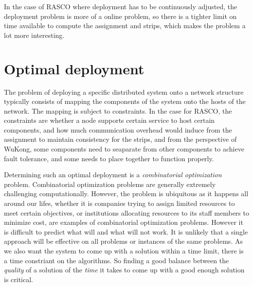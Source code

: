 In the case of RASCO where deployment has to be continuously adjusted, the
deployment problem is more of a online problem, so there is a tighter limit on
time available to compute the assignment and strips, which makes the problem 
a lot more interesting.

\section{Optimal deployment}

The problem of deploying a specific distributed system onto a network structure
typically consists of mapping the components of the system onto the hosts of
the network. The mapping is subject to constraints. In the case for RASCO, the
constraints are whether a node supports certain service to host certain
components, and how much communication overhead would induce from the
assignment to maintain consistency for the strips, and from the perspective of
WuKong, some components need to seaparate from other components to achieve
fault tolerance, and some needs to place together to function properly.

Determining such an optimal deployment is a \emph{combinatorial optimization}
problem. Combinatorial optimization problems are generally extremely
challenging computationally. However, the problem is ubiquitous as it happens
all around our lifes, whether it is companies trying to assign limited
resources to meet certain objectives, or institutions allocating resources to
its staff members to minimize cost, are examples of combinatorial optimization
problems. However it is difficult to predict what will and what will not work.
It is unlikely that a single approach will be effective on all problems or 
instances of the same problems. As we also want the system to come up with a solution within a time limit, there is a time constriant on the algorithms. So finding a good balance between the \emph{quality} of a solution of the \emph{time} it takes to come up with a good enough solution is critical.

\begin{comment}
\section{Set Covering Problem}


\subsection{Greedy Approximation Method}

\section{Hybrid Method}

\section{Discussion}
\end{comment}

